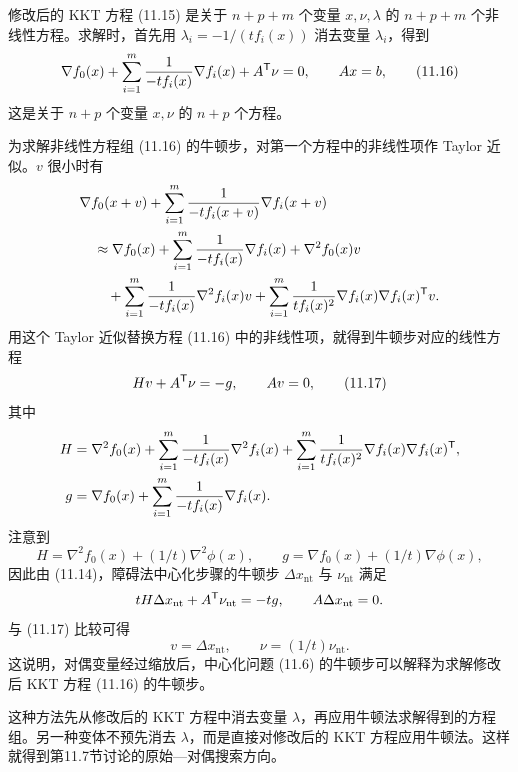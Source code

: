 修改后的 KKT 方程 (11.15) 是关于 $n+p+m$ 个变量 $x,\nu,\lambda$ 的 $n+p+m$ 个非线性方程。求解时，首先用 $\lambda_i=-1/(tf_i(x))$ 消去变量 $\lambda_i$，得到
\begin{equation}
\nabla f_0(x)+\sum_{i=1}^m\frac1{-tf_i(x)}\nabla f_i(x)+A^\mathsf T\nu=0,
\qquad Ax=b,\tag{11.16}
\end{equation}
这是关于 $n+p$ 个变量 $x,\nu$ 的 $n+p$ 个方程。

为求解非线性方程组 (11.16) 的牛顿步，对第一个方程中的非线性项作 Taylor 近似。$v$ 很小时有
\begin{align*}
&\nabla f_0(x+v)+\sum_{i=1}^m\frac1{-tf_i(x+v)}\nabla f_i(x+v)\\
&\quad\approx\nabla f_0(x)+\sum_{i=1}^m\frac1{-tf_i(x)}\nabla f_i(x)+\nabla^2 f_0(x)v\\
&\qquad+\sum_{i=1}^m\frac1{-tf_i(x)}\nabla^2 f_i(x)v
+\sum_{i=1}^m\frac1{tf_i(x)^2}\nabla f_i(x)\nabla f_i(x)^\mathsf T v.
\end{align*}
用这个 Taylor 近似替换方程 (11.16) 中的非线性项，就得到牛顿步对应的线性方程
\begin{equation}
Hv+A^\mathsf T\nu=-g,\qquad Av=0,\tag{11.17}
\end{equation}
其中
\begin{align*}
H&=\nabla^2 f_0(x)+\sum_{i=1}^m\frac1{-tf_i(x)}\nabla^2 f_i(x)
+\sum_{i=1}^m\frac1{tf_i(x)^2}\nabla f_i(x)\nabla f_i(x)^\mathsf T,\\
g&=\nabla f_0(x)+\sum_{i=1}^m\frac1{-tf_i(x)}\nabla f_i(x).
\end{align*}
注意到
\[
H=\nabla^2 f_0(x)+(1/t)\nabla^2\phi(x),\qquad
g=\nabla f_0(x)+(1/t)\nabla\phi(x),
\]
因此由 (11.14)，障碍法中心化步骤的牛顿步 $\Delta x_{\mathrm{nt}}$ 与 $\nu_{\mathrm{nt}}$ 满足
\[
tH\Delta x_{\mathrm{nt}}+A^\mathsf T\nu_{\mathrm{nt}}=-tg,\qquad A\Delta x_{\mathrm{nt}}=0.
\]
与 (11.17) 比较可得
\[
v=\Delta x_{\mathrm{nt}},\qquad\nu=(1/t)\nu_{\mathrm{nt}}.
\]
这说明，对偶变量经过缩放后，中心化问题 (11.6) 的牛顿步可以解释为求解修改后 KKT 方程 (11.16) 的牛顿步。

这种方法先从修改后的 KKT 方程中消去变量 $\lambda$，再应用牛顿法求解得到的方程组。另一种变体不预先消去 $\lambda$，而是直接对修改后的 KKT 方程应用牛顿法。这样就得到第11.7节讨论的原始—对偶搜索方向。
